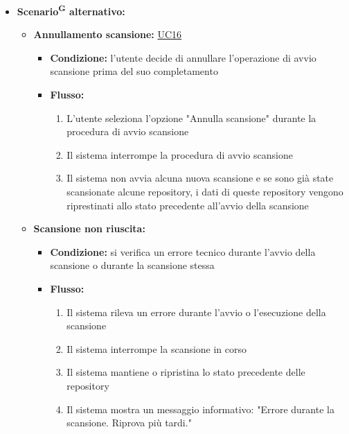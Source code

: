 \documentclass[a4paper, 11pt]{article}
\begin{document}
\begin{itemize}
\begin{enumerate}
		\item Il sistema avvia l'esecuzione dell'analisi sulle repository selezionate (\hyperref[UC17]{UC17 - Esegui analisi})
		\item Il sistema aggiorna lo stato delle repository sottoposte a scansione a "Scansione in corso"
		\item Al completamento della scansione, il sistema aggiorna le repository con i risultati dell'analisi e lo stato "Scansione completata"	
	\end{enumerate}
	\item \textbf{Scenario\textsuperscript{G} alternativo:}
	\begin{itemize}
		\item \textbf{Annullamento scansione:} \hyperref[UC16]{UC16}
			\begin{itemize}
				\item \textbf{Condizione:} l'utente decide di annullare l'operazione di avvio scansione prima del suo completamento
				\item \textbf{Flusso:} 
				\begin{enumerate}
					\item L'utente seleziona l'opzione "Annulla scansione" durante la procedura di avvio scansione
					\item Il sistema interrompe la procedura di avvio scansione
					\item Il sistema non avvia alcuna nuova scansione e se sono già state scansionate alcune repository, i dati di queste repository vengono riprestinati allo stato precedente all'avvio della scansione
				\end{enumerate}
			\end{itemize}
		\item \textbf{Scansione non riuscita:} 
			\begin{itemize}
				\item \textbf{Condizione:} si verifica un errore tecnico durante l'avvio della scansione o durante la scansione stessa
				\item \textbf{Flusso:} 
				\begin{enumerate}
					\item Il sistema rileva un errore durante l'avvio o l'esecuzione della scansione
					\item Il sistema interrompe la scansione in corso
					\item Il sistema mantiene o ripristina lo stato precedente delle repository
					\item Il sistema mostra un messaggio informativo: "Errore durante la scansione. Riprova più tardi." 

\end{enumerate}
\end{itemize}
\end{itemize}
\end{itemize}
\end{document}
